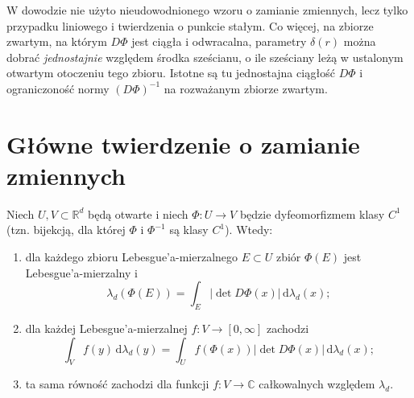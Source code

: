 \begin{uwaga}
W dowodzie nie użyto nieudowodnionego wzoru o zamianie zmiennych,
lecz tylko przypadku liniowego i twierdzenia o punkcie stałym.
Co więcej, na zbiorze zwartym, na którym $D\Phi$ jest ciągła
i odwracalna, parametry $\delta(r)$ można dobrać
\emph{jednostajnie} względem środka sześcianu, o ile sześciany
leżą w ustalonym otwartym otoczeniu tego zbioru.
Istotne są tu jednostajna ciągłość $D\Phi$ i ograniczoność
normy $(D\Phi)^{-1}$ na rozważanym zbiorze zwartym.
\end{uwaga}

\section{Główne twierdzenie o zamianie zmiennych}

\begin{twierdzenie}
\label{thm:change-variables-13}
Niech $U,V\subset\mathbb R^d$ będą otwarte i niech
$\Phi:U\to V$ będzie dyfeomorfizmem klasy $C^1$
(tzn. bijekcją, dla której $\Phi$ i $\Phi^{-1}$
są klasy $C^1$). Wtedy:
\begin{enumerate}[label=\textup{(\roman*)}]
\item dla każdego zbioru Lebesgue'a-mierzalnego $E\subset U$
zbiór $\Phi(E)$ jest Lebesgue'a-mierzalny i
\begin{equation}\label{eq:change-sets-13}
\lambda_d(\Phi(E))=\int_E |\det D\Phi(x)|\,
\mathrm d\lambda_d(x);
\end{equation}
\item dla każdej Lebesgue'a-mierzalnej
$f:V\to[0,\infty]$ zachodzi
\begin{equation}\label{eq:change-main-13}
\int_V f(y)\,\mathrm d\lambda_d(y)
=\int_U f(\Phi(x))|\det D\Phi(x)|\,
\mathrm d\lambda_d(x);
\end{equation}
\item ta sama równość zachodzi dla funkcji
$f:V\to\mathbb C$ całkowalnych względem $\lambda_d$.
\end{enumerate}
\end{twierdzenie}
